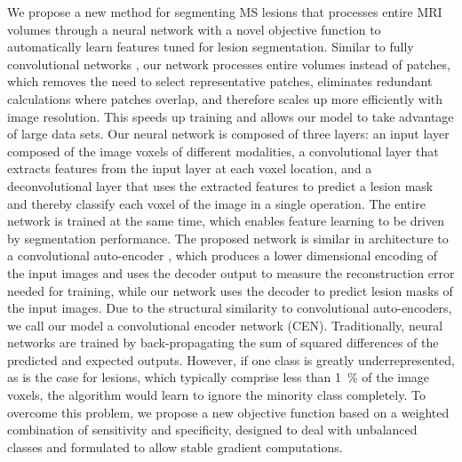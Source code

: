 We propose a new method for segmenting MS lesions that processes entire MRI
volumes through a neural network with a novel objective function to
automatically learn features tuned for lesion segmentation.
Similar to fully convolutional networks \cite{kang2014fully}, our network
processes entire volumes instead of patches, which removes the need to select
representative patches, eliminates redundant calculations where patches overlap,
and therefore scales up more efficiently with image resolution. This speeds up
training and allows our model to take advantage of large data sets.
Our neural network is composed of three layers: an input layer composed of the
image voxels of different modalities, a convolutional layer \cite{LeCun1998}
that extracts features from the input layer at each voxel location, and a
deconvolutional layer \cite{zeiler2011} that uses the extracted features to
predict a lesion mask and thereby classify each voxel of the image in a single
operation. The entire network is trained at the same time, which enables feature
learning to be driven by segmentation performance. The proposed network is
similar in architecture to a convolutional auto-encoder \cite{masci2011}, which
produces a lower dimensional encoding of the input images and uses the decoder
output to measure the reconstruction error needed for training, while our
network uses the decoder to predict lesion masks of the input images. Due to the
structural similarity to convolutional auto-encoders, we call our model a
convolutional encoder network (CEN). Traditionally, neural networks are trained
by back-propagating the sum of squared differences of the predicted and expected
outputs. However, if one class is greatly underrepresented, as is the case for
lesions, which typically comprise less than \SI{1}{\percent} of the image
voxels, the algorithm would learn to ignore the minority class completely.
To overcome this problem, we propose a new objective function based on a
weighted combination of sensitivity and specificity, designed to deal with
unbalanced classes and formulated to allow stable gradient computations.
